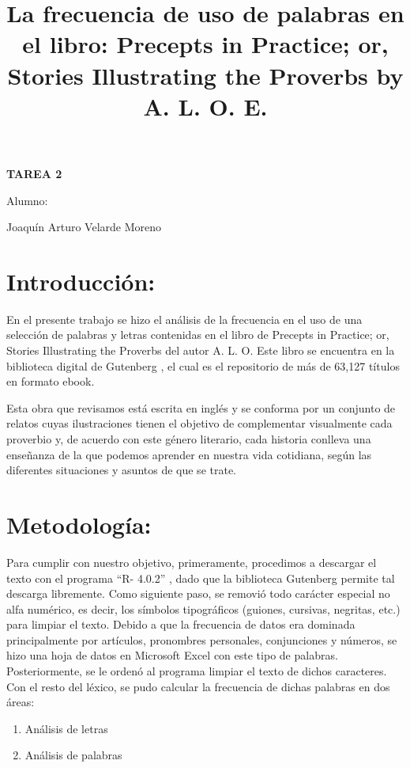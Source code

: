 \documentclass[]{article}
\title{La frecuencia de uso de palabras en el libro:
 Precepts in Practice; or, Stories Illustrating the Proverbs by A. L. O. E.}
\date{}
\begin{document}
	\maketitle
	\begin{center}


\centerline{\textbf{TAREA 2} } 
\textbf{ }

\centerline{Alumno: } 
\centerline{Joaquín Arturo Velarde Moreno}


	\end{center}
	

\section{Introducción:}

En el presente trabajo se hizo el análisis de la frecuencia en el uso de una selección de palabras y letras contenidas en el libro de Precepts in Practice; or, Stories Illustrating the Proverbs del autor A. L. O.  \cite{proverbs} 
Este libro se encuentra en la biblioteca digital de Gutenberg  \cite{guten},  el cual es el repositorio de más de 63,127 títulos en formato ebook.

Esta obra que revisamos está escrita en inglés y se conforma por un conjunto de relatos cuyas ilustraciones tienen el objetivo de complementar visualmente cada proverbio y, de acuerdo con este género literario, cada historia conlleva una enseñanza de la que podemos aprender en nuestra vida cotidiana, según las diferentes situaciones y asuntos de que se trate.

\section{Metodología:}
Para cumplir con nuestro objetivo, primeramente, procedimos a descargar el texto con el programa “R- 4.0.2” \cite{rproject}, dado que la biblioteca Gutenberg \cite{guten} permite tal descarga libremente.
Como siguiente paso, se removió todo carácter especial no alfa numérico, es decir, los símbolos tipográficos (guiones, cursivas, negritas, etc.) para limpiar el texto.
Debido a que la frecuencia de datos era dominada principalmente por artículos, pronombres personales, conjunciones y números, se hizo una hoja de datos en Microsoft Excel \cite{excel} con este tipo de palabras. Posteriormente, se le ordenó al programa limpiar el texto de dichos caracteres.
Con el resto del léxico, se pudo calcular la frecuencia de dichas palabras en dos áreas:


\begin{enumerate}
	\item Análisis de letras
	\item Análisis de palabras

\end{enumerate}
\end{document}
